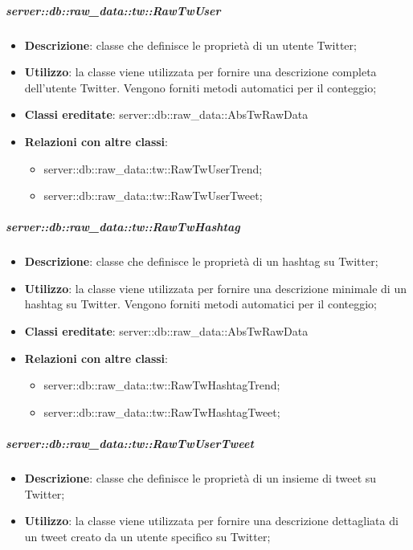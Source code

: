 		\subparagraph{server::db::raw\_data::tw::RawTwUser} %
		\label{subp:server_db_raw_data_tw_rawtwuser}
			\begin{itemize}
				\item \textbf{Descrizione}: classe che definisce le proprietà di un utente Twitter;
				\item \textbf{Utilizzo}: la classe viene utilizzata per fornire una descrizione completa dell'utente Twitter. Vengono forniti metodi automatici per il conteggio;
				\item \textbf{Classi ereditate}: server::db::raw\_data::AbsTwRawData
				\item \textbf{Relazioni con altre classi}:
					\begin{itemize}
						\item server::db::raw\_data::tw::RawTwUserTrend;
						\item server::db::raw\_data::tw::RawTwUserTweet;
					\end{itemize}
			\end{itemize}


		\subparagraph{server::db::raw\_data::tw::RawTwHashtag} %
		\label{subp:server_db_raw_data_tw_rawtwhashtag}
			\begin{itemize}
				\item \textbf{Descrizione}: classe che definisce le proprietà di un hashtag su Twitter;
				\item \textbf{Utilizzo}: la classe viene utilizzata per fornire una descrizione minimale di un hashtag su Twitter. Vengono forniti metodi automatici per il conteggio;
				\item \textbf{Classi ereditate}: server::db::raw\_data::AbsTwRawData
				\item \textbf{Relazioni con altre classi}:
					\begin{itemize}
						\item server::db::raw\_data::tw::RawTwHashtagTrend;
						\item server::db::raw\_data::tw::RawTwHashtagTweet;
					\end{itemize}
			\end{itemize}


		\subparagraph{server::db::raw\_data::tw::RawTwUserTweet} %
		\label{subp:server_db_raw_data_tw_rawtwusertweet}
			\begin{itemize}
				\item \textbf{Descrizione}: classe che definisce le proprietà di un insieme di tweet su Twitter;
				\item \textbf{Utilizzo}: la classe viene utilizzata per fornire una descrizione dettagliata di un tweet creato da un utente specifico su Twitter;
			\end{itemize}


